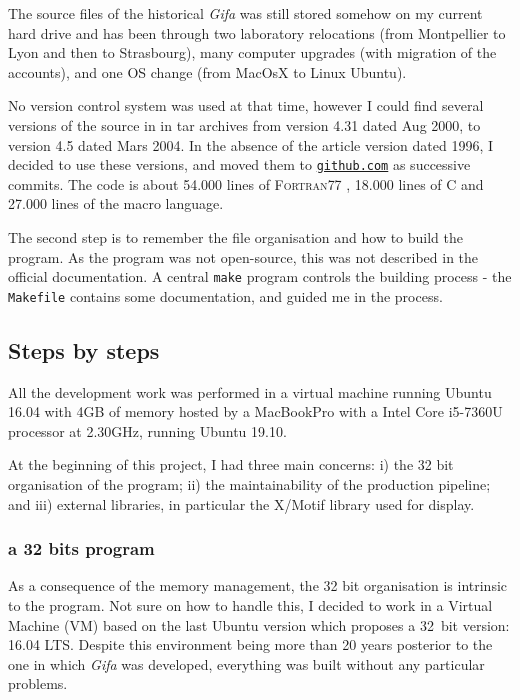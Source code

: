 The source files of the historical \emph{Gifa} was still stored somehow
on my current hard drive and has been through two laboratory relocations
(from Montpellier to Lyon and then to Strasbourg), many computer
upgrades (with migration of the accounts), and one OS change (from
MacOsX to Linux Ubuntu).

No version control system was used at that time, however I could find
several versions of the source in in tar archives from version 4.31
dated Aug 2000, to version 4.5 dated Mars 2004. In the absence of the
article version dated 1996, I decided to use these versions, and moved
them to \href{https://github.com/delsuc/Gifa}{\texttt{github.com}} as
successive commits. The code is about 54.000 lines of F\textsc{ortran}77
, 18.000 lines of C and 27.000 lines of the macro language.

The second step is to remember the file organisation and how to build
the program. As the program was not open-source, this was not described
in the official documentation. A central \texttt{make} program controls
the building process - the \texttt{Makefile} contains some
documentation, and guided me in the process.

\hypertarget{steps-by-steps}{%
\subsection{Steps by steps}\label{steps-by-steps}}

All the development work was performed in a virtual machine running
Ubuntu 16.04 with 4GB of memory hosted by a MacBookPro with a Intel Core
i5-7360U processor at 2.30GHz, running Ubuntu 19.10.

At the beginning of this project, I had three main concerns: i) the 32
bit organisation of the program; ii) the maintainability of the
production pipeline; and iii) external libraries, in particular the
X/Motif library used for display.

\hypertarget{a-32-bits-program}{%
\subsubsection{a 32 bits program}\label{a-32-bits-program}}

As a consequence of the memory management, the 32 bit organisation is
intrinsic to the program. Not sure on how to handle this, I decided to
work in a Virtual Machine (VM) based on the last Ubuntu version which
proposes a 32\ bit version: 16.04 LTS. Despite this environment being more
than 20 years posterior to the one in which \emph{Gifa} was developed,
everything was built without any particular problems.


